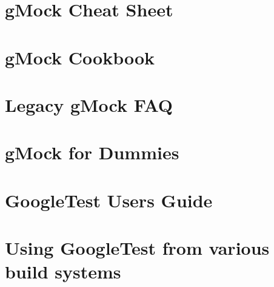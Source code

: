 \documentclass[twoside]{book}
\newcommand{\+}{\discretionary{\mbox{\scriptsize$\hookleftarrow$}}{}{}}
\begin{document}
\chapter{g\+Mock Cheat Sheet}
\label{md___users_peterjanku__sources_cpp__kilobot_arena_external_googletest_docs_gmock_cheat_sheet}

\chapter{g\+Mock Cookbook}
\label{md___users_peterjanku__sources_cpp__kilobot_arena_external_googletest_docs_gmock_cook_book}

\chapter{Legacy g\+Mock FAQ}
\label{md___users_peterjanku__sources_cpp__kilobot_arena_external_googletest_docs_gmock_faq}

\chapter{g\+Mock for Dummies}
\label{md___users_peterjanku__sources_cpp__kilobot_arena_external_googletest_docs_gmock_for_dummies}

\chapter{Google\+Test User\textquotesingle{}s Guide}
\label{md___users_peterjanku__sources_cpp__kilobot_arena_external_googletest_docs_index}

\chapter{Using Google\+Test from various build systems}
\label{md___users_peterjanku__sources_cpp__kilobot_arena_external_googletest_docs_pkgconfig}

\end{document}
